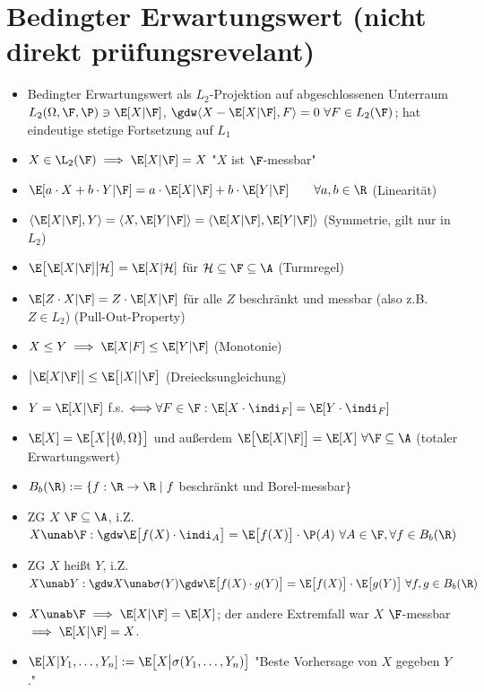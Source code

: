 
\newcommand{\directoryPrefix}{../latex/} %



	\section{Bedingter Erwartungswert (nicht direkt prüfungsrevelant)}
	\begin{itemize}
		\item Bedingter Erwartungswert als $L_2$-Projektion auf abgeschlossenen Unterraum $L_2(\Omega,\F,\P)\ni\E[X|\F]$, $\gdw\langle X-\E[X| \F],F\rangle=0~\forall F\in L_2(\F)$; hat eindeutige stetige Fortsetzung auf $L_1$
		\item $X\in\L_2(\F)\implies\E[X|\F]=X$ "$X$ ist $\F$-messbar"
		\item $\E[a\cdot X+b\cdot Y|\F]=a\cdot\E[X|\F]+b\cdot\E[Y|\F]\qquad\forall a,b\in\R$ (Linearität)
		\item $\langle\E[X|\F],Y\rangle=\langle X,\E[Y|\F]\rangle=\langle\E[X|\F],\E[Y|\F]\rangle$ (Symmetrie, gilt nur in $L_2$)
		\item $\E\big[\E[X|\F]\big|\mathcal{H}\big]=\E[X|\mathcal{H}]$ für $\mathcal{H}\subseteq\F\subseteq\A$ (Turmregel)
		\item $\E[Z\cdot X|\F]=Z\cdot\E[X|\F]$ für alle $Z$ beschränkt und messbar (also z.B. $Z\in L_2$) (Pull-Out-Property)
		\item $X\leq Y\implies \E[X|F]\leq\E[Y|\F]$ (Monotonie)
		\item $\big|\E[X|\F]\big|\leq\E\big[|X|\big|\F\big]$ (Dreiecksungleichung)
		\item $Y=\E[X|\F]$ f.s. $\Longleftrightarrow\forall F\in\F:\E[X\cdot\indi_F]=\E[Y\cdot\indi_F]$
		\item $\E[X]=\E\big[X\big|\lbrace\emptyset,\Omega\rbrace\big]$ und außerdem $\E\big[\E[X|\F]\big]=\E[X]~\forall\F\subseteq\A$ (totaler Erwartungswert)
		\item $B_b(\R):=\lbrace f:\R\to\R\mid f$ beschränkt und Borel-messbar$\rbrace$
		\item ZG $X$  $\F\subseteq\A$, i.Z. $X\unab\F:\gdw\E\big[f(X)\cdot\indi_A\big]=\E\big[f(X)\big]\cdot\P(A)~\forall A\in\F,\forall f\in B_b(\R)$
		\item ZG $X$ heißt  $Y$, i.Z. $X\unab Y:\gdw X\unab\sigma(Y)\gdw\E\big[f(X)\cdot g(Y)\big]=\E\big[f(X)\big]\cdot\E\big[g(Y)\big]~\forall f,g\in B_b(\R)$
		\item $X\unab\F\implies\E[X|\F]=\E[X]$; der andere Extremfall war $X$ $\F$-messbar $\implies\E[X|\F]=X$.
		\item $\E[X|Y_1,\ldots,Y_n]:=\E\big[X\big|\sigma(Y_1,\ldots,Y_n)\big]$ "Beste Vorhersage von $X$ gegeben $Y$."
	\end{itemize}
	
